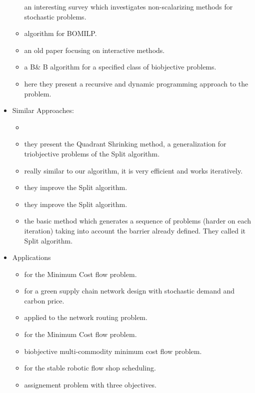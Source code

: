 \documentclass{article}
\begin{document}
\begin{itemize}
\begin{itemize}
    			\cite{surv:gutjahr2016stochastic} an interesting survey which investigates non-scalarizing methods for stochastic problems.
    			\item \cite{the:ralphs2006improved} algorithm for BOMILP.
    			\item \cite{the:ramesh1986class} an old paper focusing on interactive methods.
    			\item \cite{the:stidsen2014branch}
    			a B\& B algorithm for a specified class of biobjective problems.
    			\item \cite{the:villarreal1981multicriteria} here they present a recursive and dynamic programming approach to the problem.
    	\end{itemize}
    	\item Similar Approaches:
    	\begin{itemize}
    		\item \cite{sim:boland2017new}
    		\item \cite{sim:3obj:boland2017quadrant} they present the Quadrant Shrinking method, a generalization for triobjective problems of the Split algorithm.
    		\item \cite{sim:boland2016shape}
    		really similar to our algorithm, it is very efficient and works iteratively. 
    		\item \cite{sim:kirlik2014new}
    		they improve the Split algorithm.
    		\item \cite{sim:lokman2013finding}
    		they improve the Split algorithm.
    		\item \cite{sim:sylva2004method}
    		the basic method which generates a sequence of problems (harder on each iteration) taking into account the barrier already defined. They called it Split algorithm.
    	\end{itemize}
    	\item Applications
    	\begin{itemize}
    		\item \cite{app:sedeno2001algorithm}
    		for the Minimum Cost flow problem.
    		\item \cite{app:rezaee2017green} for a green supply chain network design with stochastic demand and carbon price.
    		\item \cite{app:ralphs2004improved} applied to the network routing problem.
    		\item \cite{app:raith2009two} for the Minimum Cost flow problem.
    		\item \cite{app:moradi2015bi} biobjective multi-commodity minimum cost flow problem.    		
    		\item \cite{app:che2017efficient} for the stable robotic flow shop scheduling.
    		\item \cite{app:3obj:przybylski2010two} assignement problem with three objectives.
    	\end{itemize}
    	
    \end{itemize}
\end{document}
